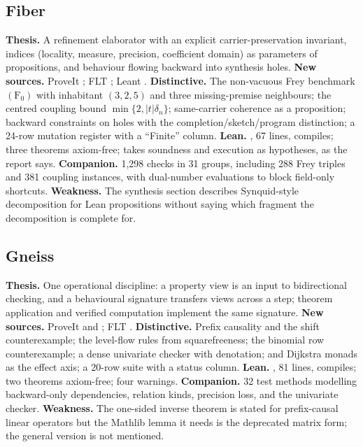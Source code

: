 \subsection*{Fiber}
\textbf{Thesis.} A refinement elaborator with an explicit carrier-preservation invariant, indices (locality, measure, precision, coefficient domain) as parameters of propositions, and behaviour flowing backward into synthesis holes. \textbf{New sources.} ProveIt ; FLT ; Leant . \textbf{Distinctive.} The non-vacuous Frey benchmark $(\mathrm{F}_0)$ with inhabitant $(3,2,5)$ and three missing-premise neighbours; the centred coupling bound $\min\{2,|t|\delta_n\}$; same-carrier coherence as a proposition; backward constraints on holes with the completion/sketch/program distinction; a 24-row mutation register with a ``Finite'' column. \textbf{Lean.} , 67 lines, compiles; three theorems axiom-free;  takes soundness and execution as hypotheses, as the report says. \textbf{Companion.} 1,298 checks in 31 groups, including 288 Frey triples and 381 coupling instances, with dual-number evaluations to block field-only shortcuts. \textbf{Weakness.} The synthesis section describes Synquid-style decomposition for Lean propositions without saying which fragment the decomposition is complete for.

\subsection*{Gneiss}
\textbf{Thesis.} One operational discipline: a property view is an input to bidirectional checking, and a behavioural signature transfers views across a step; theorem application and verified computation implement the same signature. \textbf{New sources.} ProveIt  and ; FLT . \textbf{Distinctive.} Prefix causality and the shift counterexample; the level-flow rules from squarefreeness; the binomial row counterexample; a dense univariate checker with denotation;  and Dijkstra monads as the effect axis; a 20-row suite with a status column. \textbf{Lean.} , 81 lines, compiles; two theorems axiom-free; four  warnings. \textbf{Companion.} 32 test methods modelling backward-only dependencies, relation kinds, precision loss, and the univariate checker. \textbf{Weakness.} The one-sided inverse theorem is stated for prefix-causal linear operators but the Mathlib lemma it needs is the deprecated matrix form; the general  version is not mentioned.

